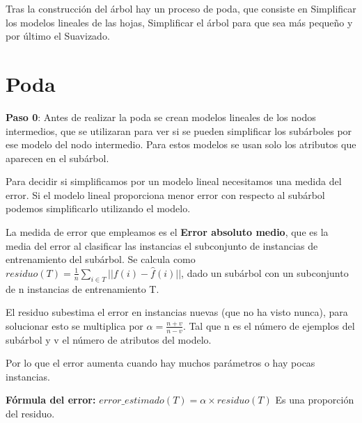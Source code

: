\documentclass[12pt, twoside, openright]{report} %
\begin{document}
Tras la construcción del árbol hay un proceso de poda, que consiste en
Simplificar los modelos lineales de las hojas, Simplificar el árbol para
que sea más pequeño y por último el Suavizado.
\pagebreak
\section{Poda}

\textbf{Paso 0}: Antes de realizar la poda se crean modelos lineales de los nodos
intermedios, que se utilizaran para ver si se pueden simplificar los subárboles por ese modelo del nodo intermedio. Para estos modelos se usan solo los atributos que aparecen en el subárbol.

Para decidir si simplificamos por un modelo lineal necesitamos una
medida del error. Si el modelo lineal proporciona menor error con
respecto al subárbol podemos simplificarlo utilizando el modelo.

La medida de error que empleamos es el \textbf{Error absoluto medio},
que es la media del error al clasificar las instancias el subconjunto de
instancias de entrenamiento del subárbol. Se calcula como $residuo(T) = \frac 1 n \sum _{i \in T} ||f(i)- \hat{f}(i)||$, dado un
subárbol con un subconjunto de n instancias de entrenamiento T.

El residuo subestima el error en instancias nuevas (que no ha visto
nunca), para solucionar esto se multiplica por
\(\alpha = \frac {n+v}{n-v}\). Tal que n es el número de ejemplos del
subárbol y v el número de atributos del modelo.

Por lo que el error aumenta cuando hay muchos parámetros o hay pocas
instancias.

\textbf{Fórmula del error:}
\(error\_estimado(T) = \alpha \times residuo(T)\) Es una proporción del
residuo.
\end{document}
